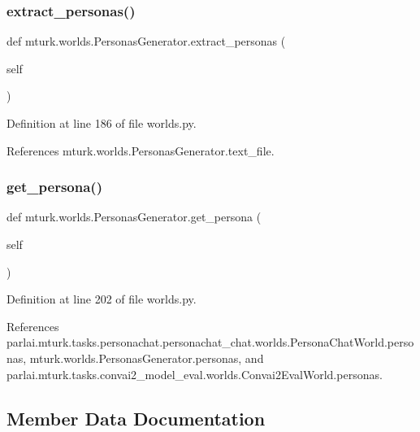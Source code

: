 \subsubsection{\texorpdfstring{extract\+\_\+personas()}{extract\_personas()}}
{\footnotesize\ttfamily def mturk.\+worlds.\+Personas\+Generator.\+extract\+\_\+personas (\begin{DoxyParamCaption}\item[{}]{self }\end{DoxyParamCaption})}



Definition at line 186 of file worlds.\+py.



References mturk.\+worlds.\+Personas\+Generator.\+text\+\_\+file.

\mbox{\label{classmturk_1_1worlds_1_1PersonasGenerator_a916c9cb4ea3c87296e1f08d762ca9b8a}} 
\subsubsection{\texorpdfstring{get\+\_\+persona()}{get\_persona()}}
{\footnotesize\ttfamily def mturk.\+worlds.\+Personas\+Generator.\+get\+\_\+persona (\begin{DoxyParamCaption}\item[{}]{self }\end{DoxyParamCaption})}



Definition at line 202 of file worlds.\+py.



References parlai.\+mturk.\+tasks.\+personachat.\+personachat\+\_\+chat.\+worlds.\+Persona\+Chat\+World.\+personas, mturk.\+worlds.\+Personas\+Generator.\+personas, and parlai.\+mturk.\+tasks.\+convai2\+\_\+model\+\_\+eval.\+worlds.\+Convai2\+Eval\+World.\+personas.



\subsection{Member Data Documentation}
\mbox{\label{classmturk_1_1worlds_1_1PersonasGenerator_ab5887fcb26ad1a57f0bcdf304ad14be8}} 
